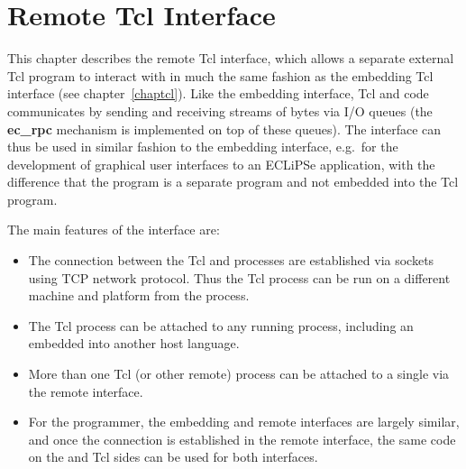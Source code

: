 %
% 
% 
% 
% 
%
%
%

\chapter{Remote Tcl Interface}
\label{chapremote}

This chapter describes the remote Tcl interface, which allows a separate
external Tcl program to interact with {\eclipse} in much the same fashion as
the embedding Tcl interface (see chapter~\ref{chaptcl}). Like the embedding
interface, Tcl and {\eclipse} code communicates by sending and receiving 
streams of bytes via I/O queues (the {\bf ec_rpc} mechanism is
implemented on top of these queues). 
The interface can thus be
used in similar fashion to the embedding interface, e.g.\ for the
development of graphical user interfaces to an ECLiPSe application, with the
difference that the {\eclipse} program is a separate program and not
embedded into the Tcl program.

The main features of the interface are:
\begin{itemize}
\item The connection between the Tcl and {\eclipse} processes are established
via sockets using TCP network protocol. Thus the Tcl process can be run on
a different machine and platform from the {\eclipse} process. 
\item The Tcl process can be attached to any running {\eclipse} process,
including an {\eclipse} embedded into another host language.
\item More than one Tcl (or other remote) process can be attached to a
single {\eclipse} via the remote interface. 
\item For the programmer, the embedding and remote interfaces are largely
similar, and once the connection is established in the remote interface,
the same code on the {\eclipse} and Tcl sides can be used for both interfaces.
\end{itemize}

